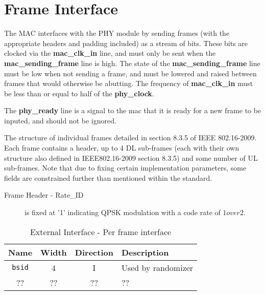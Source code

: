 \documentclass[dvips,10pt,twocolumn]{article}
\begin{document}

\section{Frame Interface}
\label{sec:frame}
The MAC interfaces with the PHY module by sending frames (with the
appropriate headers and padding included) as a stream of bits.  These bits
are clocked via the \textbf{mac\_clk\_in} line, and must only be sent when
the \textbf{mac\_sending\_frame} line is high.  The state of the
\textbf{mac\_sending\_frame} line must be low when not sending a frame, and
must be lowered and raised between frames that would otherwise be abutting.
The frequency of \textbf{mac\_clk\_in} must be less than or equal to half
of the \textbf{phy\_clock}.

The \textbf{phy\_ready} line is a signal to the mac that it is ready for a
new frame to be inputed, and should not be ignored.

The structure of individual frames detailed in section 8.3.5 of IEEE
802.16-2009.  Each frame contains a header, up to 4 DL sub-frames (each with
their own structure also defined in IEEE802.16-2009 section 8.3.5) and some
number of UL sub-frames.  Note that due to fixing certain implementation
parameters, some fields are constrained further than mentioned within the
standard.

\begin{description}
	
	\item[Frame Header - Rate\_ID] is fixed at '1' indicating QPSK
		modulation with a code rate of $1 over 2$.
	
	\item[]

\end{description}

\begin{table*}
\begin{tabularx}{\textwidth}{c|c|c|X}
	\label{tbl:frame-io}
	Name & Width & Direction & Description\\ \hline

	\texttt{bsid} & 4 & I & Used by randomizer \\

	?? & ?? & ?? & ?? 

\end{tabularx}
\caption{External Interface - Per frame interface}
\end{table*}
\end{document}
